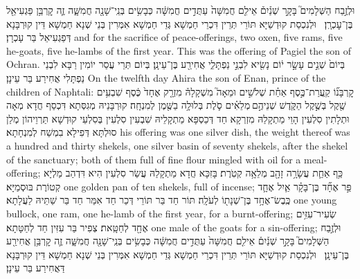 {וּלְזֶ֣בַח הַשְּׁלָמִים֮ בָּקָ֣ר שְׁנַ֒יִם֒ אֵילִ֤ם חֲמִשָּׁה֙ עַתֻּדִ֣ים חֲמִשָּׁ֔ה כְּבָשִׂ֥ים בְּנֵֽי־שָׁנָ֖ה חֲמִשָּׁ֑ה זֶ֛ה קׇרְבַּ֥ן פַּגְעִיאֵ֖ל בֶּן־עׇכְרָֽן׃ \petucha }
{וּלְנִכְסַת קוּדְשַׁיָּא תּוֹרֵי תְּרֵין דִּכְרֵי חַמְשָׁא גְּדֵי חַמְשָׁא אִמְּרִין בְּנֵי שְׁנָא חַמְשָׁא דֵּין קוּרְבָּנָא דְּפַגְעִיאֵל בַּר עָכְרָן׃}
{and for the sacrifice of peace-offerings, two oxen, five rams, five he-goats, five he-lambs of the first year. This was the offering of Pagiel the son of Ochran.}{}
{בְּיוֹם֙ שְׁנֵ֣ים עָשָׂ֣ר י֔וֹם נָשִׂ֖יא לִבְנֵ֣י נַפְתָּלִ֑י אֲחִירַ֖ע בֶּן־עֵינָֽן׃}
{בְּיוֹם תְּרֵי עֲסַר יוֹמִין רַבָּא לִבְנֵי נַפְתָּלִי אֲחִירַע בַּר עֵינָן׃}
{On the twelfth day Ahira the son of Enan, prince of the children of Naphtali:}{}
{קׇרְבָּנ֞וֹ קַֽעֲרַת־כֶּ֣סֶף אַחַ֗ת שְׁלֹשִׁ֣ים וּמֵאָה֮ מִשְׁקָלָהּ֒ מִזְרָ֤ק אֶחָד֙ כֶּ֔סֶף שִׁבְעִ֥ים שֶׁ֖קֶל בְּשֶׁ֣קֶל הַקֹּ֑דֶשׁ שְׁנֵיהֶ֣ם \legarmeh  מְלֵאִ֗ים סֹ֛לֶת בְּלוּלָ֥ה בַשֶּׁ֖מֶן לְמִנְחָֽה׃}
{קוּרְבָּנֵיהּ מְגִסְּתָא דִּכְסַף חֲדָא מְאָה וּתְלָתִין סִלְעִין הָוֵי מַתְקָלַהּ מִזְרְקָא חַד דְּכַסְפָּא מַתְקָלֵיהּ שִׁבְעִין סִלְעִין בְּסִלְעֵי קוּדְשָׁא תַּרְוֵיהוֹן מְלַן סוּלְתָּא דְּפִילָא בִמְשַׁח לְמִנְחָתָא׃}
{his offering was one silver dish, the weight thereof was a hundred and thirty shekels, one silver basin of seventy shekels, after the shekel of the sanctuary; both of them full of fine flour mingled with oil for a meal-offering;}{}
{כַּ֥ף אַחַ֛ת עֲשָׂרָ֥ה זָהָ֖ב מְלֵאָ֥ה קְטֹֽרֶת׃}
{בָּזִכָּא חֲדָא מַתְקָלַהּ עֲשַׂר סִלְעִין הִיא דִּדְהַב מַלְיָא קְטוֹרֶת בּוּסְמַיָּא׃}
{one golden pan of ten shekels, full of incense;}{}
{פַּ֣ר אֶחָ֞ד בֶּן־בָּקָ֗ר אַ֧יִל אֶחָ֛ד כֶּֽבֶשׂ־אֶחָ֥ד בֶּן־שְׁנָת֖וֹ לְעֹלָֽה׃}
{תּוֹר חַד בַּר תּוֹרֵי דְּכַר חַד אִמַּר חַד בַּר שַׁתֵּיהּ לַעֲלָתָא׃}
{one young bullock, one ram, one he-lamb of the first year, for a burnt-offering;}{}
{שְׂעִיר־עִזִּ֥ים אֶחָ֖ד לְחַטָּֽאת׃}
{צְפִיר בַּר עִזִּין חַד לְחַטָּתָא׃}
{one male of the goats for a sin-offering;}{}
{וּלְזֶ֣בַח הַשְּׁלָמִים֮ בָּקָ֣ר שְׁנַ֒יִם֒ אֵילִ֤ם חֲמִשָּׁה֙ עַתֻּדִ֣ים חֲמִשָּׁ֔ה כְּבָשִׂ֥ים בְּנֵֽי־שָׁנָ֖ה חֲמִשָּׁ֑ה זֶ֛ה קׇרְבַּ֥ן אֲחִירַ֖ע בֶּן־עֵינָֽן׃ \petucha }
{וּלְנִכְסַת קוּדְשַׁיָּא תּוֹרֵי תְּרֵין דִּכְרֵי חַמְשָׁא גְּדֵי חַמְשָׁא אִמְּרִין בְּנֵי שְׁנָא חַמְשָׁא דֵּין קוּרְבָּנָא דַּאֲחִירַע בַּר עֵינָן׃}
